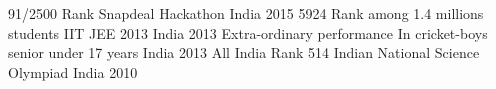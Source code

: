     \begin{cvhonors}
      \cvhonor
        { 91/2500 Rank}
        {Snapdeal Hackathon}
        {India}
        {2015}
      \cvhonor
        {5924 Rank among 1.4 millions students}
        {IIT JEE 2013}
        {India}
        {2013}
      \cvhonor
        {Extra-ordinary performance}
        {In cricket-boys senior under 17 years}
        {India}
        {2013}
      \cvhonor
        {{All India Rank} 514}
        {Indian National Science Olympiad}
        {India}
        {2010}
    \end{cvhonors}
